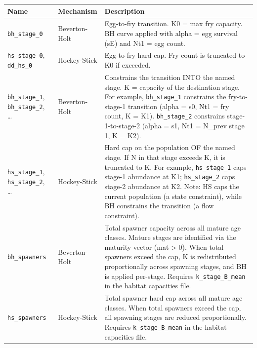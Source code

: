 \documentclass[
  letterpaper,
  DIV=11,
  numbers=noendperiod]{scrreprt}
\begin{document}
\begin{longtable}[]{@{}
  >{\raggedright\arraybackslash}p{}
  >{\raggedright\arraybackslash}p{}
  >{\raggedright\arraybackslash}p{}@{}}
\toprule\noalign{}
\begin{minipage}[b]{\linewidth}\raggedright
Name
\end{minipage} & \begin{minipage}[b]{\linewidth}\raggedright
Mechanism
\end{minipage} & \begin{minipage}[b]{\linewidth}\raggedright
Description
\end{minipage} \\
\midrule\noalign{}
\endhead
\bottomrule\noalign{}
\endlastfoot
\texttt{bh\_stage\_0} & Beverton-Holt & Egg-to-fry transition. K0 = max
fry capacity. BH curve applied with alpha = egg survival (sE) and Nt1 =
egg count. \\
\texttt{hs\_stage\_0}, \texttt{dd\_hs\_0} & Hockey-Stick & Egg-to-fry
hard cap. Fry count is truncated to K0 if exceeded. \\
\texttt{bh\_stage\_1}, \texttt{bh\_stage\_2}, \ldots{} & Beverton-Holt &
Constrains the transition INTO the named stage. K = capacity of the
destination stage. For example, \texttt{bh\_stage\_1} constrains the
fry-to-stage-1 transition (alpha = s0, Nt1 = fry count, K = K1).
\texttt{bh\_stage\_2} constrains stage-1-to-stage-2 (alpha = s1, Nt1 =
N\_prev stage 1, K = K2). \\
\texttt{hs\_stage\_1}, \texttt{hs\_stage\_2}, \ldots{} & Hockey-Stick &
Hard cap on the population OF the named stage. If N in that stage
exceeds K, it is truncated to K. For example, \texttt{hs\_stage\_1} caps
stage-1 abundance at K1; \texttt{hs\_stage\_2} caps stage-2 abundance at
K2. Note: HS caps the current population (a state constraint), while BH
constrains the transition (a flow constraint). \\
\texttt{bh\_spawners} & Beverton-Holt & Total spawner capacity across
all mature age classes. Mature stages are identified via the maturity
vector (mat \textgreater{} 0). When total spawners exceed the cap, K is
redistributed proportionally across spawning stages, and BH is applied
per-stage. Requires \texttt{k\_stage\_B\_mean} in the habitat capacities
file. \\
\texttt{hs\_spawners} & Hockey-Stick & Total spawner hard cap across all
mature age classes. When total spawners exceed the cap, all spawning
stages are reduced proportionally. Requires \texttt{k\_stage\_B\_mean}
in the habitat capacities file. \\
\end{longtable}
\end{document}
